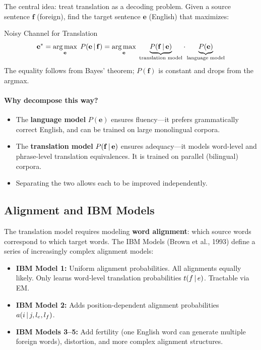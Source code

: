 The central idea: treat translation as a decoding problem.  Given a source
sentence $\mathbf{f}$ (foreign), find the target sentence $\mathbf{e}$
(English) that maximizes:

\begin{mathresult}{Noisy Channel for Translation}
\begin{equation}
\mathbf{e}^* = \operatorname*{arg\,max}_{\mathbf{e}}\; P(\mathbf{e} \,|\, \mathbf{f})
= \operatorname*{arg\,max}_{\mathbf{e}}\; \underbrace{P(\mathbf{f} \,|\, \mathbf{e})}_{\text{translation model}} \cdot \underbrace{P(\mathbf{e})}_{\text{language model}}
\label{eq:noisy_channel}
\end{equation}
The equality follows from Bayes' theorem; $P(\mathbf{f})$ is constant and
drops from the argmax.
\end{mathresult}

\paragraph{Why decompose this way?}
\begin{itemize}
    \item The \textbf{language model} $P(\mathbf{e})$ ensures fluency---it
    prefers grammatically correct English, and can be trained on large
    monolingual corpora.
    \item The \textbf{translation model} $P(\mathbf{f} \,|\, \mathbf{e})$
    ensures adequacy---it models word-level and phrase-level translation
    equivalences.  It is trained on parallel (bilingual) corpora.
    \item Separating the two allows each to be improved independently.
\end{itemize}

\subsection{Alignment and IBM Models}

The translation model requires modeling \textbf{word alignment}: which source
words correspond to which target words.  The IBM Models (Brown et al., 1993)
define a series of increasingly complex alignment models:

\begin{itemize}
    \item \textbf{IBM Model 1:} Uniform alignment probabilities.  All alignments
    equally likely.  Only learns word-level translation probabilities $t(f \,|\, e)$.
    Tractable via EM.
    \item \textbf{IBM Model 2:} Adds position-dependent alignment probabilities
    $a(i \,|\, j, l_e, l_f)$.
    \item \textbf{IBM Models 3--5:} Add fertility (one English word can generate
    multiple foreign words), distortion, and more complex alignment structures.
\end{itemize}

